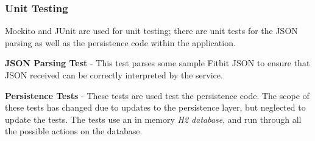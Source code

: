 \subsubsection{Unit Testing}

\par
Mockito and JUnit are used for unit testing; there are unit tests for the JSON parsing as well as the persistence code within the application.

\begin{itemized}
	\item \textbf{JSON Parsing Test} - This test parses some sample Fitbit JSON to ensure that JSON received can be correctly interpreted by the service.

	\item \textbf{Persistence Tests} - These tests are used test the persistence code. The scope of these tests has changed due to updates to the persistence layer, but neglected to update the tests. The tests use an in memory \textit{H2 database}\cite{H2}, and run through all the possible actions on the database.
\end{itemized}

